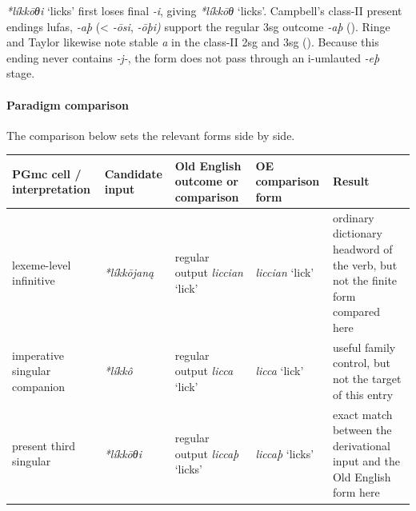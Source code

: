 \documentclass[
  british,
  a4paper,
]{article}
\newcounter{none} %
\providecommand{\Recon}[1]{\emph{*#1}}
\begin{document}
\Recon{líkkōθi} `licks' first loses final \emph{-i}, giving
\Recon{líkkōθ} `licks'. Campbell's class-II present endings lufas,
\emph{-aþ} (\textless{} \emph{-ōsi}, \emph{-ōþi)} support the regular
3sg outcome \emph{-aþ} (). Ringe and Taylor likewise note stable \emph{a} in the class-II
2sg and 3sg ().
Because this ending never contains \emph{-j-}, the form does not pass
through an i-umlauted \emph{-eþ} stage.

\paragraph{Paradigm comparison}\label{paradigm-comparison-10}

The comparison below sets the relevant forms side by side.

{\def\LTcaptype{none} %
\begin{longtable}[]{@{}
  >{\raggedright\arraybackslash}p{}
  >{\raggedright\arraybackslash}p{}
  >{\raggedright\arraybackslash}p{}
  >{\raggedright\arraybackslash}p{}
  >{\raggedright\arraybackslash}p{}@{}}
\toprule\noalign{}
\begin{minipage}[b]{\linewidth}\raggedright
PGmc cell / interpretation
\end{minipage} & \begin{minipage}[b]{\linewidth}\raggedright
Candidate input
\end{minipage} & \begin{minipage}[b]{\linewidth}\raggedright
Old English outcome or comparison
\end{minipage} & \begin{minipage}[b]{\linewidth}\raggedright
OE comparison form
\end{minipage} & \begin{minipage}[b]{\linewidth}\raggedright
Result
\end{minipage} \\
\midrule\noalign{}
\endhead
\bottomrule\noalign{}
\endlastfoot
lexeme-level infinitive & {\emph{*líkkōjaną}} & regular output
{\emph{liccian}} `lick' & {\emph{liccian}} `lick' & ordinary dictionary
headword of the verb, but not the finite form compared here \\
imperative singular companion & {\emph{*líkkô}} & regular output
{\emph{licca}} `lick' & {\emph{licca}} `lick' & useful family control,
but not the target of this entry \\
present third singular & {\emph{*líkkōθi}} & regular output
{\emph{liccaþ}} `licks' & {\emph{liccaþ}} `licks' & exact match between
the derivational input and the Old English form here \\
\end{longtable}
}
\end{document}

